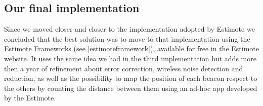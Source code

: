 \subsection{Our final implementation}
Since we moved closer and closer to the implementation adopted by Estimote we concluded that the best solution was to move to that implementation using the Estimote Frameworks (see \ref{estimoteframework}), available for free in the Estimote website. It uses the same idea we had in the third implementation but adds more then a year of refinement about error correction, wireless noise detection and reduction, as well as the possibility to map the position of each beacon respect to the others by counting the distance between them using an ad-hoc app developed by the Estimote.